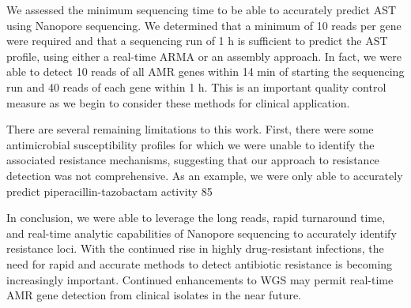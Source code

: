 We assessed the minimum sequencing time to be able to accurately predict AST using Nanopore sequencing. We determined that a minimum of 10 reads per gene were required and that a sequencing run of 1 h is sufficient to predict the AST profile, using either a real-time ARMA or an assembly approach. In fact, we were able to detect 10 reads of all AMR genes within 14 min of starting the sequencing run and 40 reads of each gene within 1 h. This is an important quality control measure as we begin to consider these methods for clinical application.

There are several remaining limitations to this work. First, there were some antimicrobial susceptibility profiles for which we were unable to identify the associated resistance mechanisms, suggesting that our approach to resistance detection was not comprehensive. As an example, we were only able to accurately predict piperacillin-tazobactam activity 85%

In conclusion, we were able to leverage the long reads, rapid turnaround time, and real-time analytic capabilities of Nanopore sequencing to accurately identify resistance loci. With the continued rise in highly drug-resistant infections, the need for rapid and accurate methods to detect antibiotic resistance is becoming increasingly important. Continued enhancements to WGS may permit real-time AMR gene detection from clinical isolates in the near future.

